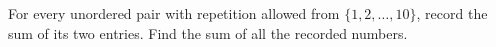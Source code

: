 For every unordered pair with repetition allowed from $\{1,2,\ldots,10\}$, record the sum of its two entries. Find the sum of all the recorded numbers.
